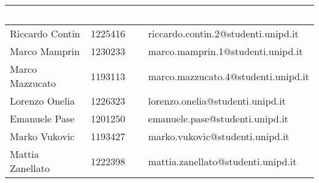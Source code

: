 \begin{center}
  \centering
  \begin{longtable}{|C{3,3cm}|C{2cm}|C{7cm}|}
    \hline
    \textcolor[HTML]{FFFFFF}{\textbf{Nominativo}} & \textcolor[HTML]{FFFFFF}{\textbf{Matricola}} & \textcolor[HTML]{FFFFFF}{\textbf{Posta Elettronica}} \\ \hline
    Riccardo Contin & 1225416 & riccardo.contin.2@studenti.unipd.it \\ \hline
    Marco Mamprin & 1230233 & marco.mamprin.1@studenti.unipd.it \\ \hline
    Marco Mazzucato & 1193113 & marco.mazzucato.4@studenti.unipd.it \\ \hline
    Lorenzo Onelia & 1226323 & lorenzo.onelia@studenti.unipd.it \\ \hline
    Emanuele Pase & 1201250 & emanuele.pase@studenti.unipd.it \\ \hline
    Marko Vukovic & 1193427 & marko.vukovic@studenti.unipd.it \\ \hline
    Mattia Zanellato & 1222398 & mattia.zanellato@studenti.unipd.it \\ \hline
  \end{longtable}
\end{center}
